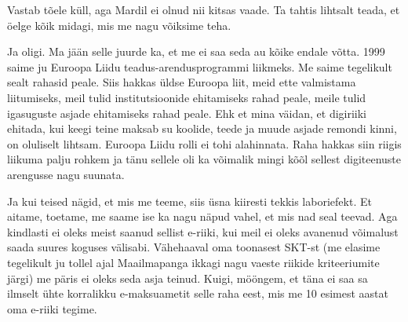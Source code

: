 
Vastab tõele küll, aga Mardil ei olnud nii kitsas vaade. Ta tahtis lihtsalt 
teada, et öelge kõik midagi, mis me nagu võiksime teha.


Ja oligi. Ma jään selle juurde ka, et me ei saa seda au kõike endale võtta. 
1999 saime ju Euroopa Liidu teadus-arendusprogrammi liikmeks. Me saime 
tegelikult sealt rahasid peale. Siis hakkas üldse Euroopa liit, meid ette 
valmistama liitumiseks, meil tulid institutsioonide ehitamiseks rahad peale, 
meile tulid igasuguste asjade ehitamiseks rahad peale. Ehk et mina väidan, et 
digiriiki ehitada, kui keegi teine maksab su koolide, teede ja muude asjade 
remondi kinni, on oluliselt lihtsam. Euroopa Liidu rolli ei tohi alahinnata. 
Raha hakkas siin riigis liikuma palju rohkem ja tänu sellele oli ka võimalik 
mingi kõõl sellest digiteenuste arengusse nagu suunata.


Ja kui teised nägid, et mis me teeme, siis üsna kiiresti tekkis laboriefekt. Et 
aitame, toetame, me saame ise ka nagu näpud vahel, et mis nad seal teevad. Aga 
kindlasti ei oleks meist saanud sellist e-riiki, kui meil ei oleks avanenud  
võimalust saada suures koguses välisabi. Vähehaaval oma toonasest SKT-st (me 
elasime tegelikult ju tollel ajal Maailmapanga ikkagi nagu vaeste riikide 
kriteeriumite järgi) me päris ei oleks seda asja teinud. Kuigi, mööngem, et 
täna ei saa sa ilmselt ühte korralikku e-maksuametit selle raha eest, mis me 10 
esimest aastat oma e-riiki tegime.


